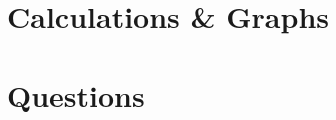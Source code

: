 \documentclass[a4paper,12pt]{article}
\begin{document}




\section{Calculations \& Graphs}

\vspace{-0.5cm}
\singlespacing




 \section{Questions}

\vspace{-0.5cm}
\singlespacing
\end{document}
